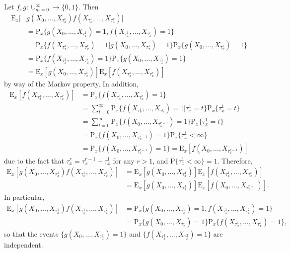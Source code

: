 \documentclass[12pt]{article}
\newcommand{\E}{\mathrm{E}}
\newcommand{\Prob}{\mathrm{P}}
\begin{document}
Let $f, g : \cup_{m=0}^\infty \to \{0, 1\}$. Then
\begin{align*}
\E_x[&g(X_0, \ldots, X_{\tau_x^1})f(X_{\tau_x^1}, \ldots, X_{\tau_x^r})] \\
&= \Prob_x\{g(X_0, \ldots, X_{\tau_x^1}) = 1, f(X_{\tau_x^1}, \ldots, X_{\tau_x^r}) = 1\} \\
&= \Prob_x\{f(X_{\tau_x^1}, \ldots, X_{\tau_x^r}) = 1 | g(X_0, \ldots, X_{\tau_x^1}) = 1\} \Prob_x\{g(X_0, \ldots, X_{\tau_x^1}) = 1\} \\
&= \Prob_x\{f(X_{\tau_x^1}, \ldots, X_{\tau_x^r}) = 1\} \Prob_x\{g(X_0, \ldots, X_{\tau_x^1}) = 1\} \\
&= \E_x[g(X_0, \ldots, X_{\tau_x^1})] \E_x[f(X_{\tau_x^1}, \ldots, X_{\tau_x^r})]
\end{align*}
by way of the Markov property. In addition,
\begin{align*}
\E_x[f(X_{\tau_x^1}, \ldots, X_{\tau_x^r})] &= \Prob_x\{f(X_{\tau_x^1}, \ldots, X_{\tau_x^r}) = 1\} \\
&= \sum_{t=0}^\infty \Prob_x\{f(X_{\tau_x^1}, \ldots, X_{\tau_x^r}) = 1 | \tau_x^1 = t\} \Prob_x\{\tau_x^1 = t\} \\
&= \sum_{t=0}^\infty \Prob_x\{f(X_0, \ldots, X_{\tau_x^{r-1}}) = 1\} \Prob_x\{\tau_x^1 = t\} \\
&= \Prob_x\{f(X_0, \ldots, X_{\tau_x^{r-1}}) = 1\} \Prob_x\{\tau_x^1 < \infty\} \\
&= \Prob_x\{f(X_0, \ldots, X_{\tau_x^{r-1}}) = 1\} = \E_x[f(X_0, \ldots, X_{\tau_x^{r-1}})]
\end{align*}
due to the fact that $\tau_x^r = \tau_x^{r-1} + \tau_x^1$ for any $r > 1$, and $\Prob\{\tau_x^1 < \infty\} = 1$. Therefore,
\begin{align*}
\E_x[g(X_0, \ldots, X_{\tau_x^1})f(X_{\tau_x^1}, \ldots, X_{\tau_x^r})] &= \E_x[g(X_0, \ldots, X_{\tau_x^1})] \E_x[f(X_{\tau_x^1}, \ldots, X_{\tau_x^r})] \\
&= \E_x[g(X_0, \ldots, X_{\tau_x^1})] \E_x[f(X_0, \ldots, X_{\tau_x^{r-1}})].
\end{align*}
In particular,
\begin{align*}
\E_x[g(X_0, \ldots, X_{\tau_x^1})f(X_{\tau_x^1}, \ldots, X_{\tau_x^2})] &= \Prob_x\{g(X_0, \ldots, X_{\tau_x^1}) = 1, f(X_{\tau_x^1}, \ldots, X_{\tau_x^2}) = 1\} \\
&= \Prob_x\{g(X_0, \ldots, X_{\tau_x^1}) = 1\} \Prob_x\{f(X_{\tau_x^1}, \ldots, X_{\tau_x^2}) = 1\},
\end{align*}
so that the events $\{g(X_0, \ldots, X_{\tau_x^1}) = 1\}$ and $\{f(X_{\tau_x^1}, \ldots, X_{\tau_x^2}) = 1\}$ are independent.
\end{document}
